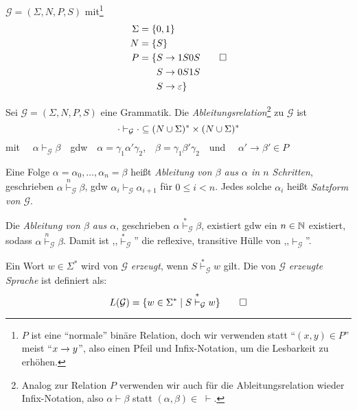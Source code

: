 \begin{Bsp}\label{bsp:3.sameNumber}
  $\mathcal{G} = (\Sigma, N, P, S)$ mit\footnote{$P$ ist eine ``normale'' binäre Relation, 
  doch wir verwenden statt ``$(x,y)\in P$'' meist ``$x\-> y$'', also einen Pfeil und Infix-Notation, um die Lesbarkeit zu erhöhen.}
	\begin{align*}
		\Sigma &= \{ 0, 1 \}\\
		N &= \{S\}\\
		P &= \begin{aligned}[t]
      \{ S & \to 1S0S \\
        S & \to 0S1S \\
        S & \to \varepsilon
      \}
        \end{aligned}
      \qedhere
	\end{align*}
\end{Bsp}
% 
%   
\begin{Def}
  Sei $\mathcal{G} =(\Sigma,N,P,S)$ eine Grammatik.
	Die \emph{Ableitungsrelation}\footnote{Analog zur Relation $P$ verwenden wir auch für die Ableitungsrelation wieder Infix-Notation, also $\alpha\vdash\beta$ statt $(\alpha,\beta)\in\;\vdash$.}
	zu $\mathcal{G}$ ist 
  \begin{displaymath}
    \cdot \vdash_\mathcal{G} \cdot \subseteq (N\cup\Sigma)^*\times(N\cup\Sigma)^*
  \end{displaymath}
  mit \ \ $\alpha \vdash_\mathcal{G} \beta$\ \  gdw\ \  $\alpha = \gamma_1\alpha'\gamma_2$,\ \  $\beta = \gamma_1\beta'\gamma_2$\ \  und \ \ $\alpha' \to \beta' \in P$

  Eine Folge $\alpha = \alpha_0,\ldots,\alpha_n = \beta$ heißt \emph{Ableitung von $\beta$ aus $\alpha$ in $n$ Schritten}, geschrieben $\alpha \stackrel{n}{\vdash}_\mathcal{G} \beta$, gdw $\alpha_i \vdash_\mathcal{G} \alpha_{i+1}$ für $0 \le i < n$.
  Jedes solche $\alpha_i$ heißt \emph{Satzform von $\mathcal{G}$}.

  Die \emph{Ableitung von $\beta$ aus $\alpha$}, geschrieben $\alpha \stackrel{*}{\vdash}_\mathcal{G} \beta$, existiert gdw ein $n \in \mathbb{N}$ existiert, sodass $\alpha \stackrel{n}{\vdash}_\mathcal{G} \beta$.
  Damit ist ,,$\stackrel{*}{\vdash}_\mathcal{G}$'' die reflexive, transitive Hülle von ,,$\vdash_\mathcal{G}$''.

  Ein Wort $w\in\Sigma^*$ wird von $\mathcal{G}$ \emph{erzeugt}, wenn $S \stackrel{*}{\vdash}_{\mathcal{G}} w$ gilt.
	Die von $\mathcal{G}$ \emph{erzeugte Sprache} ist definiert als:
	\[ L(\mathcal{G}) = \{w\in\Sigma^* \mid S \stackrel{*}{\vdash}_{\mathcal{G}} w \} \qedhere \]
\end{Def}




